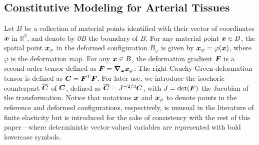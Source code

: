 \subsection{Constitutive Modeling for Arterial Tissues}
\label{subsubsec:constitutive-modeling}
Let $B$ be a collection of material points identified with their vector of coordinates $\boldsymbol{x}$ in $\mathbb{R}^3$, and denote by $\partial B$ the boundary of $B$. For any material point $\boldsymbol{x} \in B$, the spatial point $\boldsymbol{x}_\varphi$ in the deformed configuration $B_\varphi$ is given by $\boldsymbol{x}_\varphi = \varphi (\boldsymbol{x})$, where $\varphi$ is the deformation map. For any $\boldsymbol{x} \in B$, the deformation gradient $\boldsymbol{F}$ is a second-order tensor defined as $\boldsymbol{F} = \boldsymbol{\nabla}_{\boldsymbol{x}} \boldsymbol{x}_\varphi$. The right Cauchy-Green deformation tensor is defined as $\boldsymbol{C} = \boldsymbol{F}^T \boldsymbol{F}$. For later use, we introduce the isochoric counterpart $\overline{\boldsymbol{C}}$ of $\boldsymbol{C}$, defined as $\overline{\boldsymbol{C}} = J^{-2/3}\boldsymbol{C}$, with $J = \det(\boldsymbol{F})$ the Jacobian of the transformation. Notice that notations $\boldsymbol{x}$ and $\boldsymbol{x}_\varphi$ to denote points in the reference and deformed configurations, respectively, is unusual in the literature of finite elasticity \cite{Ciarlet1988} but is introduced for the sake of consistency with the rest of this paper---where deterministic vector-valued variables are represented with bold lowercase symbols.

